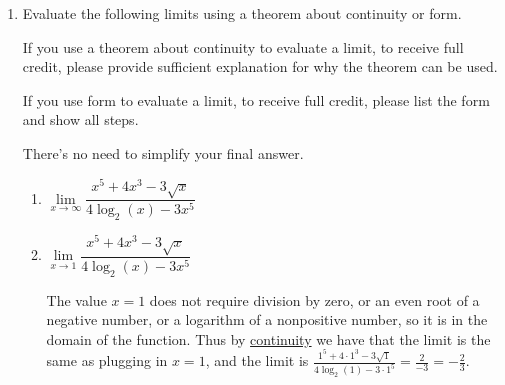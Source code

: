 \documentclass[11pt]{article}
\begin{document}
\begin{enumerate}
\newpage


\item Evaluate the following limits using a theorem about continuity or form.

If you use a theorem about continuity to evaluate a limit, to receive full credit, please provide sufficient explanation for why the theorem can be used. 

If you use form to evaluate a limit, to receive full credit, please list the form and show all steps. 

There's no need to simplify your final answer.

\begin{enumerate}
    \item $\lim\limits_{x\to\infty}\dfrac{x^5+4x^3-3\sqrt{x}}{4\log_2(x)-3x^5}$

    \vspace{.4in}

    {}

    \vspace{1in}

    \item $\lim\limits_{x\to 1}\dfrac{x^5+4x^3-3\sqrt{x}}{4\log_2(x)-3x^5}$

    \vspace{.4in}

    {  The value $x=1$ does not require division by zero, or an even root of a negative number, or a logarithm of a nonpositive number, so it is in the domain of the function.  Thus by \underline{continuity} we have that the limit is the same as plugging in $x=1$, and the limit is $\frac{1^5 + 4 \cdot 1^3 - 3 \sqrt{1}}{4 \log_2 (1) - 3 \cdot 1^5} = \frac{2}{-3} = \boxed{-\frac23}$.}

    \vfill
\end{enumerate}


\end{enumerate}
\end{document}
